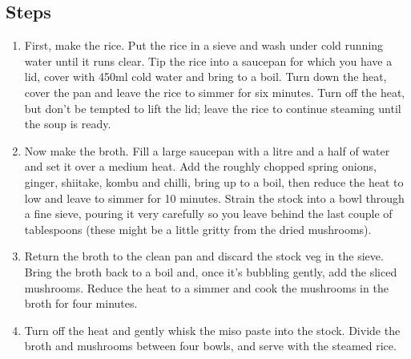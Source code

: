 \documentclass{book}
\begin{document}
\subsection*{Steps}
\begin{enumerate}
\item First, make the rice. Put the rice in a sieve and wash under cold running water until it runs clear. Tip the rice into a saucepan for which you have a lid, cover with 450ml cold water and bring to a boil. Turn down the heat, cover the pan and leave the rice to simmer for six minutes. Turn off the heat, but don’t be tempted to lift the lid; leave the rice to continue steaming until the soup is ready.
\item Now make the broth. Fill a large saucepan with a litre and a half of water and set it over a medium heat. Add the roughly chopped spring onions, ginger, shiitake, kombu and chilli, bring up to a boil, then reduce the heat to low and leave to simmer for 10 minutes. Strain the stock into a bowl through a fine sieve, pouring it very carefully so you leave behind the last couple of tablespoons (these might be a little gritty from the dried mushrooms).
\item Return the broth to the clean pan and discard the stock veg in the sieve. Bring the broth back to a boil and, once it’s bubbling gently, add the sliced mushrooms. Reduce the heat to a simmer and cook the mushrooms in the broth for four minutes.
\item Turn off the heat and gently whisk the miso paste into the stock. Divide the broth and mushrooms between four bowls, and serve with the steamed rice.
\end{enumerate}
\newpage
\end{document}
